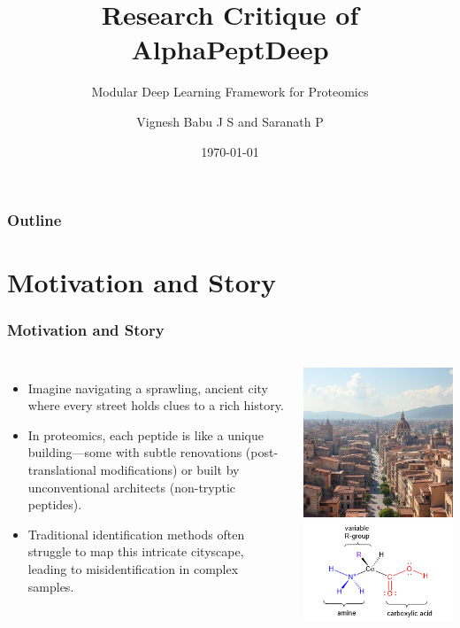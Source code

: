\documentclass{beamer}
\title{Research Critique of AlphaPeptDeep}
\subtitle{Modular Deep Learning Framework for Proteomics}
\author{Vignesh Babu J S and Saranath P}
\date{\today}
\begin{document}
\begin{frame}
  \titlepage
\end{frame}

\begin{frame}
  \frametitle{Outline}
  \tableofcontents
\end{frame}

\section{Motivation and Story}
\begin{frame}
  \frametitle{Motivation and Story}
  \begin{columns}
      \begin{itemize}
        \item Imagine navigating a sprawling, ancient city where every street holds clues to a rich history.
        \item In proteomics, each peptide is like a unique building—some with subtle renovations (post-translational modifications) or built by unconventional architects (non-tryptic peptides).
        \item Traditional identification methods often struggle to map this intricate cityscape, leading to misidentification in complex samples.
      \end{itemize}
      \includegraphics[width=0.7\linewidth]{image1.jpeg}\\[1em]
      \includegraphics[width=0.7\linewidth]{peptide.png}
  \end{columns}
\end{frame}
\end{document}
